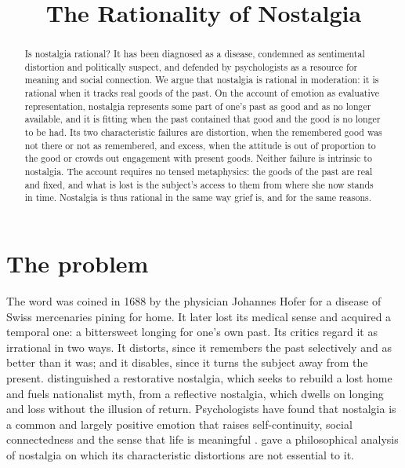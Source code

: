 \documentclass{situationist-preprint}
\title{The Rationality of Nostalgia}
\begin{document}
\maketitle

\begin{abstract}
Is nostalgia rational? It has been diagnosed as a disease, condemned as sentimental distortion and politically suspect, and defended by psychologists as a resource for meaning and social connection. We argue that nostalgia is rational in moderation: it is rational when it tracks real goods of the past. On the account of emotion as evaluative representation, nostalgia represents some part of one's past as good and as no longer available, and it is fitting when the past contained that good and the good is no longer to be had. Its two characteristic failures are distortion, when the remembered good was not there or not as remembered, and excess, when the attitude is out of proportion to the good or crowds out engagement with present goods. Neither failure is intrinsic to nostalgia. The account requires no tensed metaphysics: the goods of the past are real and fixed, and what is lost is the subject's access to them from where she now stands in time. Nostalgia is thus rational in the same way grief is, and for the same reasons.
\end{abstract}

\section{The problem}

The word was coined in 1688 by the physician Johannes Hofer for a disease of Swiss mercenaries pining for home. It later lost its medical sense and acquired a temporal one: a bittersweet longing for one's own past. Its critics regard it as irrational in two ways. It distorts, since it remembers the past selectively and as better than it was; and it disables, since it turns the subject away from the present. \citet{Boym2001} distinguished a restorative nostalgia, which seeks to rebuild a lost home and fuels nationalist myth, from a reflective nostalgia, which dwells on longing and loss without the illusion of return. Psychologists have found that nostalgia is a common and largely positive emotion that raises self-continuity, social connectedness and the sense that life is meaningful \citep{WildschutEtAl2006, SedikidesEtAl2008}. \citet{Howard2012} gave a philosophical analysis of nostalgia on which its characteristic distortions are not essential to it.
\end{document}

